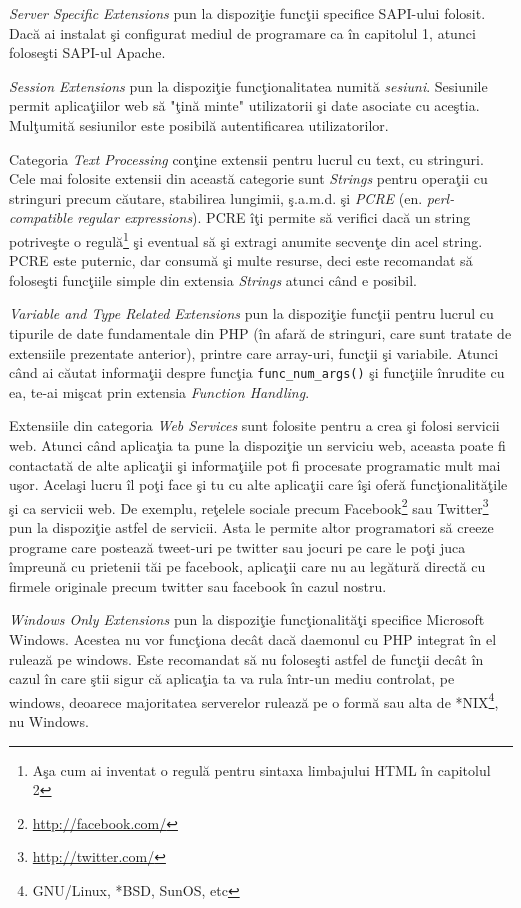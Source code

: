\textit{Server Specific Extensions} pun la dispoziţie
funcţii specifice SAPI-ului folosit. Dacă ai instalat
şi configurat mediul de programare ca în capitolul 1,
atunci foloseşti SAPI-ul Apache.

\textit{Session Extensions} pun la dispoziţie funcţionalitatea
numită \textsl{sesiuni}. Sesiunile permit aplicaţiilor web
să "ţină minte" utilizatorii şi date asociate cu aceştia.
Mulţumită sesiunilor este posibilă autentificarea utilizatorilor.

Categoria \textit{Text Processing} conţine extensii pentru
lucrul cu text, cu stringuri. Cele mai folosite extensii
din această categorie sunt \textit{Strings} pentru operaţii
cu stringuri precum căutare, stabilirea lungimii, ş.a.m.d.
şi \textit{PCRE} (en. \textsl{perl-compatible regular expressions}).
PCRE îţi permite să verifici dacă un string potriveşte o
regulă\footnote{Aşa cum ai inventat o regulă pentru
sintaxa limbajului HTML în capitolul 2} şi eventual
să şi extragi anumite secvenţe din acel string.\\
PCRE este puternic, dar consumă şi multe resurse,
deci este recomandat să foloseşti funcţiile simple
din extensia \textit{Strings} atunci când e posibil.

\textit{Variable and Type Related Extensions} pun
la dispoziţie funcţii pentru lucrul cu tipurile
de date fundamentale din PHP (în afară de stringuri,
care sunt tratate de extensiile prezentate anterior), printre
care array-uri, funcţii şi variabile. Atunci când ai căutat
informaţii despre funcţia \texttt{func\_num\_args()}
şi funcţiile înrudite cu ea, te-ai mişcat prin extensia
\textit{Function Handling}.

Extensiile din categoria \textit{Web Services} sunt folosite
pentru a crea şi folosi servicii web. Atunci când aplicaţia
ta pune la dispoziţie un serviciu web, aceasta poate
fi contactată de alte aplicaţii şi informaţiile pot
fi procesate programatic mult mai uşor. Acelaşi lucru îl
poţi face şi tu cu alte aplicaţii care îşi oferă
funcţionalităţile şi ca servicii web. De exemplu,
reţelele sociale precum Facebook\footnote{\url{http://facebook.com/}}
sau Twitter\footnote{\url{http://twitter.com/}} pun la dispoziţie
astfel de servicii. Asta le permite altor programatori să
creeze programe care postează tweet-uri pe twitter sau
jocuri pe care le poţi juca împreună cu prietenii tăi
pe facebook, aplicaţii care nu au legătură directă
cu firmele originale precum twitter sau facebook în
cazul nostru.

\textit{Windows Only Extensions} pun la dispoziţie funcţionalităţi
specifice Microsoft Windows. Acestea nu vor funcţiona decât dacă
daemonul cu PHP integrat în el rulează pe windows.
Este recomandat să nu foloseşti astfel de funcţii
decât în cazul în care ştii sigur că aplicaţia ta
va rula într-un mediu controlat, pe windows, deoarece
majoritatea serverelor rulează pe o formă sau alta
de *NIX\footnote{GNU/Linux, *BSD, SunOS, etc}, nu Windows.

